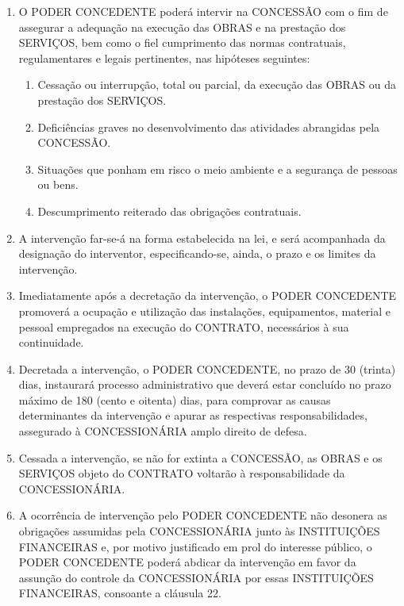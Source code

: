 \documentclass[a4paper,11pt]{report} %
\begin{document}
\begin{enumerate}
\item \label{itm:TBTD} O PODER CONCEDENTE poderá intervir na CONCESSÃO com o fim de assegurar a adequação na execução das OBRAS e na prestação dos SERVIÇOS, bem como o fiel cumprimento das normas contratuais, regulamentares e legais pertinentes, nas hipóteses seguintes:

\begin{enumerate}[label*=\arabic*.]
\item \label{itm:ZSZH} Cessação ou interrupção, total ou parcial, da execução das OBRAS ou da prestação dos SERVIÇOS.

\item \label{itm:ZZJ6} Deficiências graves no desenvolvimento das atividades abrangidas pela CONCESSÃO.

\item \label{itm:JEEN} Situações que ponham em risco o meio ambiente e a segurança de pessoas ou bens.

\item \label{itm:EKSG} Descumprimento reiterado das obrigações contratuais.
\end{enumerate}

\item \label{itm:WKQ5} A intervenção far-se-á na forma estabelecida na lei, e será acompanhada da designação do interventor, especificando-se, ainda, o prazo e os limites da intervenção.

\item \label{itm:AQ7C} Imediatamente após a decretação da intervenção, o PODER CONCEDENTE promoverá a ocupação e utilização das instalações, equipamentos, material e pessoal empregados na execução do CONTRATO, necessários à sua continuidade.
\item \label{itm:QJ2B} Decretada a intervenção, o PODER CONCEDENTE, no prazo de 30 (trinta) dias, instaurará processo administrativo que deverá estar concluído no prazo máximo de 180 (cento e oitenta) dias, para comprovar as causas determinantes da intervenção e apurar as respectivas responsabilidades, assegurado à CONCESSIONÁRIA amplo direito de defesa.

\item \label{itm:789U} Cessada a intervenção, se não for extinta a CONCESSÃO, as OBRAS e os SERVIÇOS objeto do CONTRATO voltarão à responsabilidade da CONCESSIONÁRIA.

\item \label{itm:49DF} A ocorrência de intervenção pelo PODER CONCEDENTE não desonera as obrigações assumidas pela CONCESSIONÁRIA junto às INSTITUIÇÕES FINANCEIRAS e, por motivo justificado em prol do interesse público, o PODER CONCEDENTE poderá abdicar da intervenção em favor da assunção do controle da CONCESSIONÁRIA por essas INSTITUIÇÕES FINANCEIRAS, consoante a cláusula 22.


\end{enumerate}
\end{document}
